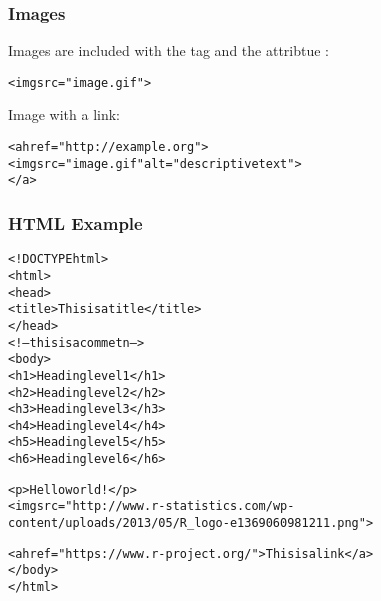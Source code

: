 \documentclass[12pt]{beamer}\usepackage[]{graphicx}\usepackage[]{color}
\makeatletter
\newcommand{\hlstr}[1]{\textcolor[rgb]{0.192,0.494,0.8}{#1}}%
\newenvironment{kframe}{%
 \def\at@end@of@kframe{}%
 \ifinner\ifhmode%
  \def\at@end@of@kframe{\end{minipage}}%
  \begin{minipage}{\columnwidth}%
 \fi\fi%
 \def\FrameCommand##1{\hskip\@totalleftmargin \hskip-\fboxsep
 \colorbox{shadecolor}{##1}\hskip-\fboxsep
     \hskip-\linewidth \hskip-\@totalleftmargin \hskip\columnwidth}%
 \MakeFramed {\advance\hsize-\width
   \@totalleftmargin\z@ \linewidth\hsize
   \@setminipage}}%
 {\par\unskip\endMakeFramed%
 \at@end@of@kframe}
\newenvironment{knitrout}{}{} %
\makeatother
\begin{document}

\begin{frame}[fragile]
\frametitle{Images}

Images are included with the {\hilit {}} tag and the attribtue {\hilit {}}:
\begin{knitrout}\footnotesize
{}\color{fgcolor}\begin{kframe}
\begin{alltt}
<img src=\hlstr{"image.gif"}>
\end{alltt}
\end{kframe}
\end{knitrout}

\bigskip
Image with a link:
\begin{knitrout}\footnotesize
{}\color{fgcolor}\begin{kframe}
\begin{alltt}
<a href=\hlstr{"http://example.org"}>
  <img src=\hlstr{"image.gif"} alt=\hlstr{"descriptive text"}>
</a>
\end{alltt}
\end{kframe}
\end{knitrout}

\end{frame}


\begin{frame}[fragile]
\frametitle{HTML Example}

\begin{knitrout}\footnotesize
{}\color{fgcolor}\begin{kframe}
\begin{alltt}
<!DOCTYPE html>
<html>
  <head>
    <title>This is a title</title>
  </head>
  <!-- this is a commetn -->
  <body>
    <h1>Heading level 1</h1>
    <h2>Heading level 2</h2>
    <h3>Heading level 3</h3>
    <h4>Heading level 4</h4>
    <h5>Heading level 5</h5>
    <h6>Heading level 6</h6>  

    <p>Hello world!</p>
    <img src=\hlstr{"http://www.r-statistics.com/wp-content/uploads/2013/05/R_logo-e1369060981211.png"}>
  
    <a href=\hlstr{"https://www.r-project.org/"}>This is a link</a>
  </body>
</html>
\end{alltt}
\end{kframe}
\end{knitrout}

\end{frame}
\end{document}
